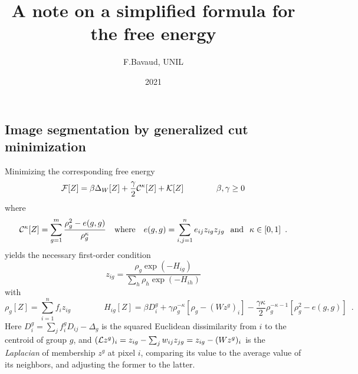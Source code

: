 \documentclass[11pt]{paper}
\title{A note on a simplified formula for the free energy}
\author{F.Bavaud, UNIL}
\date{2021}
\begin{document}
\maketitle





\subsection{Image segmentation by generalized cut minimization}
Minimizing the corresponding free energy 
\begin{equation}
\label{fee2}
{\cal F}[Z]=\beta\Delta_W[Z]+\frac{\gamma}{2} {\cal C}^\kappa[Z]+{\cal K}[Z]\qquad\qquad \beta,\gamma\ge0
\end{equation}
where 
\begin{equation}
\label{wggc}
{\cal C}^\kappa[Z]= \sum_{g=1}^m \frac{\rho_g^2-e(g,g)}{\rho_g^\kappa}\quad
\mbox{where}\quad e(g,g)=\sum_{i,j=1}^ne_{ij}z_{ig}z_{jg}\hspace{0.25cm}\mbox{and}\hspace{0.25cm}\kappa\in [0,1]\enspace. 
\end{equation}
yields the necessary first-order condition 
\begin{equation} 
\label{iter2t}
z_{ig}=\frac{\rho_g \exp( - H_{ig})}{\sum_h \rho_h \exp(- H_{ih})}
\end{equation}
with
\begin{equation}
\label{Hconti}
\rho_g[Z]=\sum_{i=1}^n f_i z_{ig}
\qquad\qquad
H_{ig}[Z]=\beta D_i^g +\gamma\rho_g^{-\kappa} [\rho_g-(Wz^g)_i]
-\frac{\gamma\kappa}{2} \rho_g^{-\kappa-1}[\rho_g^2-e(g,g)]\enspace. 
\end{equation} 
Here $D_i^g=\sum_j f_i^g D_{ij}-\Delta_g$ is the squared Euclidean dissimilarity from $i$ to the centroid of group $g$, and $ ({\cal L}z^g)_i=z_{ig}-\sum_j w_{ij}z_{jg}=z_{ig}-(Wz^g)_i$ is the {\em Laplacian} of membership $z^g$ at pixel $i$, comparing its value to the average value of its neighbors, and adjusting the former to the latter. 

\
\end{document}

